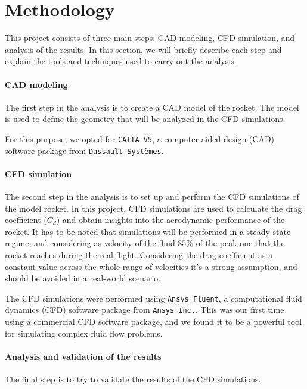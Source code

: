 \section{Methodology}
\label{sec:methodology}

This project consists of three main steps: CAD modeling, CFD simulation, and analysis of the results.
In this section, we will briefly describe each step and explain the tools and techniques used to carry out the analysis.

\paragraph{CAD modeling}

The first step in the analysis is to create a CAD model of the rocket.
The model is used to define the geometry that will be analyzed in the CFD simulations.

For this purpose, we opted for \texttt{CATIA V5}, a computer-aided design (CAD) software package from \texttt{Dassault Systèmes}.


\paragraph{CFD simulation}

The second step in the analysis is to set up and perform the CFD simulations of the model rocket.
In this project, CFD simulations are used to calculate the drag coefficient ($C_d$) and obtain insights into the aerodynamic performance of the rocket.
It has to be noted that simulations will be performed in a steady-state regime, and considering as velocity of the fluid $85\%$ of the peak one that the rocket reaches during the real flight.
Considering the drag coefficient as a constant value across the whole range of velocities it's a strong assumption, and should be avoided in a real-world scenario.

The CFD simulations were performed using \texttt{Ansys Fluent}, a computational fluid dynamics (CFD) software package from \texttt{Ansys Inc.}.
This was our first time using a commercial CFD software package, and we found it to be a powerful tool for simulating complex fluid flow problems.


\paragraph{Analysis and validation of the results}

The final step is to try to validate the results of the CFD simulations.

